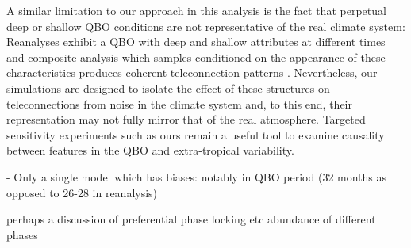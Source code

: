 A similar limitation to our approach in this analysis is the fact that perpetual deep or shallow QBO conditions are not representative of the real climate system: Reanalyses exhibit a QBO with deep and shallow attributes at different times and composite analysis which samples conditioned on the appearance of these characteristics produces coherent teleconnection patterns \citep{andrewsObserved2019d}. Nevertheless, our simulations are designed to isolate the effect of these structures on teleconnections from noise in the climate system and, to this end, their representation may not fully mirror that of the real atmosphere. Targeted sensitivity experiments such as ours remain a useful tool to examine causality between features in the QBO and extra-tropical variability.


- Only a single model which has biases: 
    notably in QBO period (32 months as opposed to 26-28 in reanalysis) 
    
    perhaps a discussion of preferential phase locking etc abundance of different phases